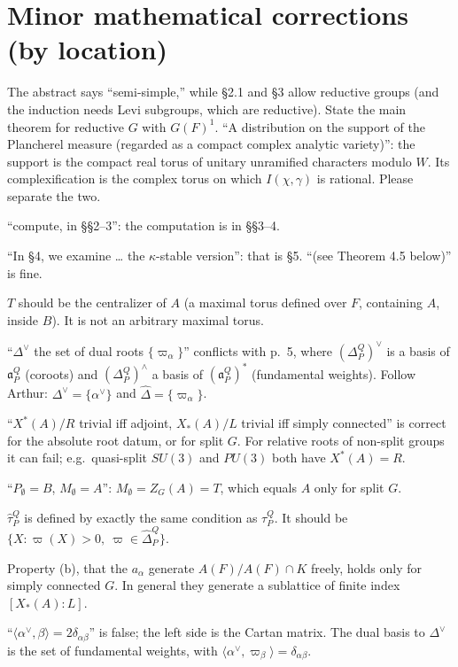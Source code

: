 \documentclass[11pt]{article}
\newcommand{\fa}{\mathfrak{a}}
\newcommand{\ip}[1]{\langle #1\rangle}
\begin{document}
\section{Minor mathematical corrections (by location)}
\begin{description}[leftmargin=1.2em,style=nextline]
\item[Abstract / p.~2] The abstract says ``semi-simple,'' while \S2.1 and \S3 allow reductive groups (and the induction needs Levi subgroups, which are reductive). State the main theorem for reductive $G$ with $G(F)^1$. ``A distribution on the support of the Plancherel measure (regarded as a compact complex analytic variety)'': the support is the compact real torus of unitary unramified characters modulo $W$. Its complexification is the complex torus on which $I(\chi,\gamma)$ is rational. Please separate the two.
\item[p.~2] ``compute, in \S\S2--3'': the computation is in \S\S3--4.
\item[p.~3] ``In \S4, we examine \dots{} the $\kappa$-stable version'': that is \S5. ``(see Theorem 4.5 below)'' is fine.
\item[p.~4, \S2.1] $T$ should be the centralizer of $A$ (a maximal torus defined over $F$, containing $A$, inside $B$). It is not an arbitrary maximal torus.
\item[p.~4] ``$\Delta^\vee$ the set of dual roots $\{\varpi_\alpha\}$'' conflicts with p.~5, where $(\Delta_P^Q)^\vee$ is a basis of $\fa_P^Q$ (coroots) and $(\Delta_P^Q)^\wedge$ a basis of $(\fa_P^Q)^*$ (fundamental weights). Follow Arthur: $\Delta^\vee=\{\alpha^\vee\}$ and $\hat\Delta=\{\varpi_\alpha\}$.
\item[p.~5] ``$X^*(A)/R$ trivial iff adjoint, $X_*(A)/L$ trivial iff simply connected'' is correct for the absolute root datum, or for split $G$. For relative roots of non-split groups it can fail; e.g.\ quasi-split $SU(3)$ and $PU(3)$ both have $X^*(A)=R$.
\item[p.~5] ``$P_\emptyset=B$, $M_\emptyset=A$'': $M_\emptyset=Z_G(A)=T$, which equals $A$ only for split $G$.
\item[p.~5] $\hat\tau_P^Q$ is defined by exactly the same condition as $\tau_P^Q$. It should be $\{X:\varpi(X)>0,\ \varpi\in\hat\Delta_P^Q\}$.
\item[p.~6] Property (b), that the $a_\alpha$ generate $A(F)/A(F)\cap K$ freely, holds only for simply connected $G$. In general they generate a sublattice of finite index $[X_*(A):L]$.
\item[p.~6] ``$\ip{\alpha^\vee,\beta}=2\delta_{\alpha\beta}$'' is false; the left side is the Cartan matrix. The dual basis to $\Delta^\vee$ is the set of fundamental weights, with $\ip{\alpha^\vee,\varpi_\beta}=\delta_{\alpha\beta}$.

\end{description}
\end{document}
